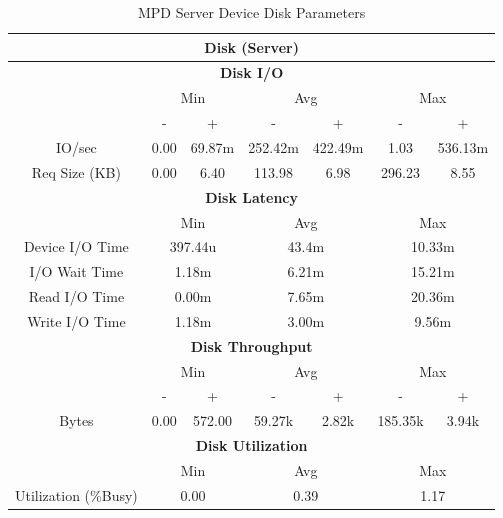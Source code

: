 \documentclass[11pt,a4paper,headinclude=false,footinclude=false]{scrreprt}
\begin{document}
\begin{table}[H]
\centering
    \begin{tabular}{||c|c|c|c|c|c|c||}
    \hline
    \multicolumn{7}{|c|}{\textbf{Disk (Server)}} \\
    \hline
    \multicolumn{7}{|c|}{\textbf{Disk I/O}} \\
    \hline\hline
      & \multicolumn{2}{|c|}{Min} & \multicolumn{2}{|c|}{Avg} & \multicolumn{2}{|c|}{Max} \\
    \hline
      & - & + & - & + & - & + \\
    \hline
    IO/sec & 0.00 & 69.87m & 252.42m & 422.49m & 1.03 & 536.13m \\
    \hline
    Req Size (KB) & 0.00 & 6.40 & 113.98 & 6.98 & 296.23 & 8.55 \\
    \hline\hline
    \multicolumn{7}{|c|}{\textbf{Disk Latency}} \\
    \hline\hline
      & \multicolumn{2}{|c|}{Min} & \multicolumn{2}{|c|}{Avg} & \multicolumn{2}{|c|}{Max} \\
    \hline
    Device I/O Time  & \multicolumn{2}{|c|}{397.44u} & \multicolumn{2}{|c|}{43.4m} & \multicolumn{2}{|c|}{10.33m} \\
    \hline
    I/O Wait Time  & \multicolumn{2}{|c|}{1.18m} & \multicolumn{2}{|c|}{6.21m} & \multicolumn{2}{|c|}{15.21m} \\
    \hline
    Read I/O Time  & \multicolumn{2}{|c|}{0.00m} & \multicolumn{2}{|c|}{7.65m} & \multicolumn{2}{|c|}{20.36m} \\
    \hline
    Write I/O Time  & \multicolumn{2}{|c|}{1.18m} & \multicolumn{2}{|c|}{3.00m} & \multicolumn{2}{|c|}{9.56m} \\
    \hline\hline
    \multicolumn{7}{|c|}{\textbf{Disk Throughput}} \\
    \hline\hline
      & \multicolumn{2}{|c|}{Min} & \multicolumn{2}{|c|}{Avg} & \multicolumn{2}{|c|}{Max} \\
    \hline
      & - & + & - & + & - & + \\
    \hline
    Bytes & 0.00 & 572.00 & 59.27k & 2.82k & 185.35k & 3.94k \\
    \hline\hline
    \multicolumn{7}{|c|}{\textbf{Disk Utilization}} \\
    \hline\hline
      & \multicolumn{2}{|c|}{Min} & \multicolumn{2}{|c|}{Avg} & \multicolumn{2}{|c|}{Max} \\
    \hline
    Utilization (\%Busy)  & \multicolumn{2}{|c|}{0.00} & \multicolumn{2}{|c|}{0.39} & \multicolumn{2}{|c|}{1.17} \\
    \hline\hline
    \end{tabular}
    \caption{MPD Server Device Disk Parameters}
    \label{MPDserverDiskTab}
\end{table}
\end{document}
